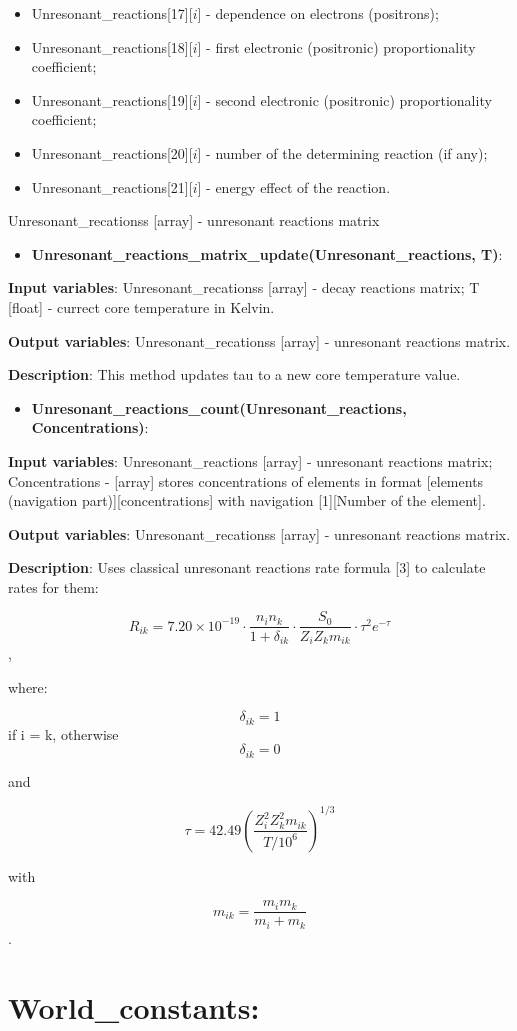\documentclass[a4paper,12pt]{article}
\newcommand{\namefunction}[4]{
  \begin{itemize}
    \item \textbf{#1}:
  \end{itemize}
  
  \textbf{Input variables}: #2.
  
  \textbf{Output variables}: #4.
  
  \textbf{Description}: #3.
}
\begin{document}
{\begin{itemize}
    \item Unresonant\_reactions[17][$i$] - dependence on electrons (positrons);
    \item Unresonant\_reactions[18][$i$] - first electronic (positronic) proportionality coefficient;
    \item Unresonant\_reactions[19][$i$] - second electronic (positronic) proportionality coefficient;
    \item Unresonant\_reactions[20][$i$] - number of the determining reaction (if any);
    \item Unresonant\_reactions[21][$i$] - energy effect of the reaction.
\end{itemize}


}{Unresonant\_recationss [array] - unresonant reactions matrix}

\vspace{1em}

\namefunction{Unresonant\_reactions\_matrix\_update(Unresonant\_reactions, T)}{Unresonant\_recationss [array] - decay reactions matrix; T [float] - currect core temperature in Kelvin}{This method updates tau to a new core temperature value}{Unresonant\_recationss [array] - unresonant reactions matrix}

\vspace{1em}

\namefunction{Unresonant\_reactions\_count(Unresonant\_reactions, Concentrations)}{Unresonant\_reactions [array] - unresonant reactions matrix; Concentrations - [array] stores concentrations of elements in format [elements (navigation part)][concentrations] with navigation [1][Number of the element]}{Uses classical unresonant reactions rate formula [3] to calculate rates for them:

\[R_{ik} = 7.20 \times 10^{-19} \cdot \frac{n_i n_k}{1 + \delta_{ik}} \cdot \frac{S_0}{Z_i Z_k m_{ik}} \cdot \tau^2 e^{-\tau}\], 

where:

\[\delta_{ik} = 1\] if i = k, otherwise \[\delta_{ik} = 0\]

and

\[\tau = 42.49 \left(\frac{Z_i^2 Z_k^2 m_{ik}}{T/10^6}\right)^{1/3}\]

with

\[m_{ik} = \frac{m_i m_k}{m_i + m_k}\]}{Unresonant\_recationss [array] - unresonant reactions matrix}

\section{World\_constants:}
\end{document}
